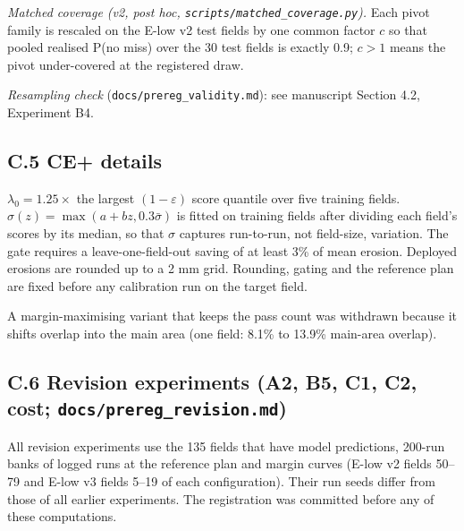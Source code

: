 \documentclass[preprint,12pt,authoryear]{elsarticle}
\begin{document}
\emph{Matched coverage (v2, post hoc, \texttt{scripts/matched\_coverage.py}).} Each pivot family is rescaled on the E-low v2 test fields by one common factor \(c\) so that pooled realised P(no miss) over the 30 test fields is exactly 0.9; \(c>1\) means the pivot under-covered at the registered draw.

\emph{Resampling check} (\texttt{docs/prereg\_validity.md}): see manuscript Section 4.2, Experiment B4.

\subsection*{C.5 CE+ details}

\(\lambda_0=1.25\times\) the largest \((1-\varepsilon)\) score quantile over five training fields. \(\sigma(z)=\max(a+bz,0.3\bar\sigma)\) is fitted on training fields after dividing each field's scores by its median, so that \(\sigma\) captures run-to-run, not field-size, variation. The gate requires a leave-one-field-out saving of at least 3\% of mean erosion. Deployed erosions are rounded up to a 2 mm grid. Rounding, gating and the reference plan are fixed before any calibration run on the target field.

A margin-maximising variant that keeps the pass count was withdrawn because it shifts overlap into the main area (one field: 8.1\% to 13.9\% main-area overlap).

\subsection*{\texorpdfstring{C.6 Revision experiments (A2, B5, C1, C2, cost; \texttt{docs/prereg\_revision.md})}{C.6 Revision experiments (A2, B5, C1, C2, cost; docs/prereg\_revision.md)}}

All revision experiments use the 135 fields that have model predictions, 200-run banks of logged runs at the reference plan and margin curves (E-low v2 fields 50--79 and E-low v3 fields 5--19 of each configuration). Their run seeds differ from those of all earlier experiments. The registration was committed before any of these computations.
\end{document}
